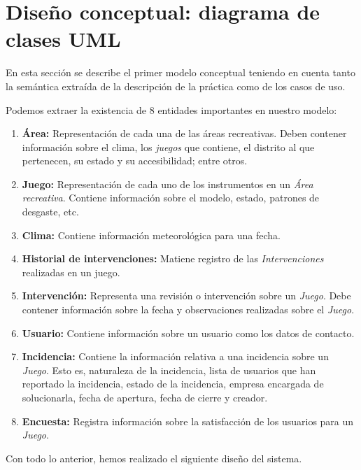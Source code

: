 \documentclass[]{article}
\begin{document}
\section{Diseño conceptual: diagrama de clases UML}
\label{sec:disenno}
En esta sección se describe el primer modelo conceptual teniendo en cuenta tanto la semántica extraída de la descripción de la práctica como de los casos de uso.

Podemos extraer la existencia de 8 entidades importantes en nuestro modelo:
\begin{enumerate}
    \item \textbf{Área:} Representación de cada una de las áreas recreativas. Deben contener información sobre el clima, los \textit{juegos} que contiene, el distrito al que pertenecen, su estado y su accesibilidad; entre otros.
    \item \textbf{Juego:} Representación de cada uno de los instrumentos en un \textit{Área recreativa}. Contiene información sobre el modelo, estado, patrones de desgaste, etc.
    \item \textbf{Clima:} Contiene información meteorológica para una fecha.
    \item \textbf{Historial de intervenciones:} Matiene registro de las \textit{Intervenciones} realizadas en un juego.
    \item \textbf{Intervención:} Representa una revisión o intervención sobre un \textit{Juego}. Debe contener información sobre la fecha y observaciones realizadas sobre el \textit{Juego}.
    \item \textbf{Usuario:} Contiene información sobre un usuario como los datos de contacto.
    \item \textbf{Incidencia:} Contiene la información relativa a una incidencia sobre un \textit{Juego}. Esto es, naturaleza de la incidencia, lista de usuarios que han reportado la incidencia, estado de la incidencia, empresa encargada de solucionarla, fecha de apertura, fecha de cierre y creador.
    \item \textbf{Encuesta:} Registra información sobre la satisfacción de los usuarios para un \textit{Juego}.
\end{enumerate}
Con todo lo anterior, hemos realizado el siguiente diseño del sistema.
\end{document}
